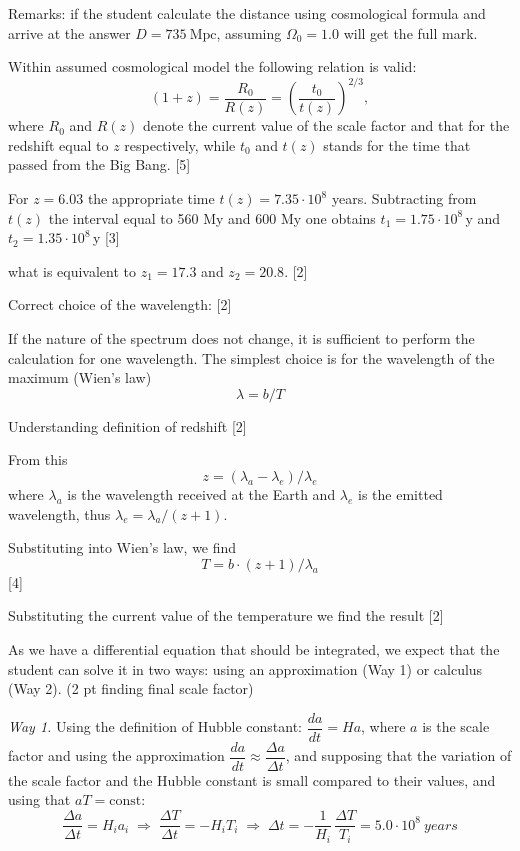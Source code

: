 Remarks: if the student calculate the distance using cosmological formula and
arrive at the answer $D = 735~\mathrm{Mpc}$, assuming $\Omega_0 = 1.0$ will
get the full mark.

Within assumed cosmological model the following relation is valid:
\[
(1+z) = \frac{R_0}{R(z)} = \left(\frac{t_0}{t(z)}\right)^{2/3},
\]
where $R_0$ and $R(z)$ denote the current value of the scale factor and that
for the redshift equal to $z$ respectively, while $t_0$ and $t(z)$ stands for
the time that passed from the Big Bang. \hfill[5]

For $z=6.03$ the appropriate time $t(z) = 7.35\cdot10^{8}$ years. Subtracting
from $t(z)$ the interval equal to 560 My and 600 My one obtains
$t_1 = 1.75\cdot10^{8}$\,y and $t_2 = 1.35\cdot10^{8}$\,y \hfill[3]

what is equivalent to $z_1 = 17.3$ and $z_2 = 20.8$. \hfill[2]

Correct choice of the wavelength: \hfill[2]

If the nature of the spectrum does not change, it is sufficient to perform the
calculation for one wavelength. The simplest choice is for the wavelength of
the maximum (Wien's law)
\[
\lambda = b/T
\]

Understanding definition of redshift \hfill[2]

From this
\[
z = (\lambda_a - \lambda_e)/\lambda_e
\]
where $\lambda_a$ is the wavelength received at the Earth and $\lambda_e$ is
the emitted wavelength, thus $\lambda_e = \lambda_a/(z+1)$.

Substituting into Wien's law, we find
\[
T = b\cdot(z+1)/\lambda_a
\]
\hfill[4]

Substituting the current value of the temperature we find the result \hfill[2]

As we have a differential equation that should be integrated, we expect that
the student can solve it in two ways: using an approximation (Way 1) or
calculus (Way 2). \hfill(2 pt finding final scale factor)

\medskip
\noindent\textit{Way 1.}
Using the definition of Hubble constant:
$\dfrac{da}{dt} = Ha$, where $a$ is the scale factor and using the
approximation $\dfrac{da}{dt} \approx \dfrac{\Delta a}{\Delta t}$, and
supposing that the variation of the scale factor and the Hubble constant is
small compared to their values, and using that $aT = \mathrm{const}$:
\begin{equation*}
\frac{\Delta a}{\Delta t} = H_i a_i
\;\Rightarrow\;
\frac{\Delta T}{\Delta t} = -H_i T_i
\;\Rightarrow\;
\Delta t = -\frac{1}{H_i}\,\frac{\Delta T}{T_i} = 5.0\cdot10^{8}~years
\tag*{(7 pt + 1 pt)}
\end{equation*}

